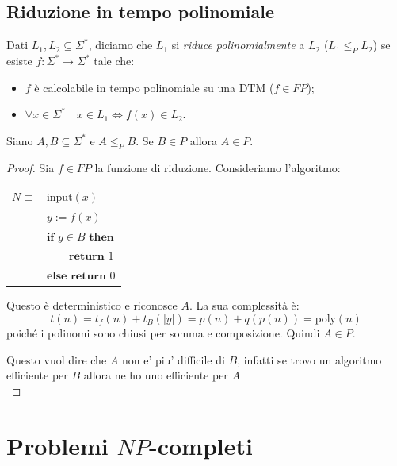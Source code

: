 \subsection*{Riduzione in tempo polinomiale}

Dati $L_1, L_2 \subseteq \Sigma^*$, diciamo che $L_1$ si \emph{riduce polinomialmente} a $L_2$ ($L_1 \leq_P L_2$) se esiste $f : \Sigma^* \rightarrow \Sigma^*$ tale che:
\begin{itemize}
    \item $f$ è calcolabile in tempo polinomiale su una DTM ($f \in FP$);
    \item $\forall x \in \Sigma^* \quad x \in L_1 \Leftrightarrow f(x) \in L_2$.\\
\end{itemize}

\begin{theor}
Siano $A, B \subseteq \Sigma^*$ e $A \leq_P B$. Se $B \in P$ allora $A \in P$.
\end{theor}

\begin{proof}
  Sia $f \in FP$ la funzione di riduzione. Consideriamo l’algoritmo:

\begin{center}
	\begin{tabular}{r|l|}
		\cline{2-2}
		$N \equiv$	& $\text{input}(x)$ \\
			& $y := f(x) $ \\
											& $\textbf{if } y \in B \textbf{ then}$ \\
	  		& $  \quad \quad \textbf{return } 1$ \\
			& $ \textbf{else return } 0 $ \\
		\cline{2-2}
	\end{tabular}
\end{center}

Questo è deterministico e riconosce $A$. La sua complessità è:
\[
t(n) = t_f(n) + t_{B}(|y|) = p(n) + q(p(n)) = \text{poly}(n)
\]
poiché i polinomi sono chiusi per somma e composizione. Quindi $A \in P$.

Questo vuol dire che $A$ non e' piu' difficile di $B$, infatti se trovo un algoritmo efficiente per $B$ allora ne ho uno efficiente per $A$ \\
\end{proof}

\section*{Problemi $NP$-completi}

